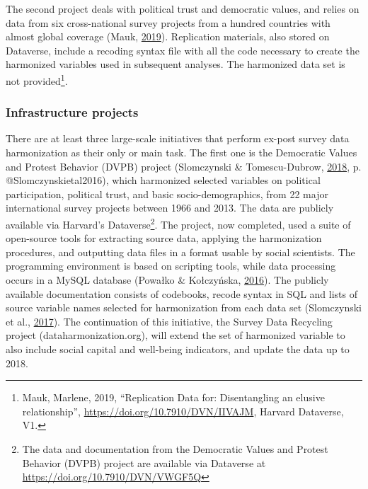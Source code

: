 \documentclass[12pt,]{article}
\let\rmarkdownfootnote\footnote%
\def\footnote{\protect\rmarkdownfootnote}
\begin{document}
The second project deals with political trust and democratic values, and relies on data from six cross-national survey projects from a hundred countries with almost global coverage (Mauk, \protect\hyperlink{ref-Mauk2019}{2019}). Replication materials, also stored on Dataverse, include a recoding syntax file with all the code necessary to create the harmonized variables used in subsequent analyses. The harmonized data set is not provided\footnote{Mauk, Marlene, 2019, ``Replication Data for: Disentangling an elusive relationship'', \url{https://doi.org/10.7910/DVN/IIVAJM}, Harvard Dataverse, V1.}.

\hypertarget{infrastructure-projects}{%
\subsubsection{Infrastructure projects}\label{infrastructure-projects}}

There are at least three large-scale initiatives that perform ex-post survey data harmonization as their only or main task. The first one is the Democratic Values and Protest Behavior (DVPB) project (Slomczynski \& Tomescu-Dubrow, \protect\hyperlink{ref-Slomczynski2018}{2018}, p. @Slomczynskietal2016), which harmonized selected variables on political participation, political trust, and basic socio-demographics, from 22 major international survey projects between 1966 and 2013. The data are publicly available via Harvard's Dataverse\footnote{The data and documentation from the Democratic Values and Protest Behavior (DVPB) project are available via Dataverse at \url{https://doi.org/10.7910/DVN/VWGF5Q}}.
The project, now completed, used a suite of open-source tools for extracting source data, applying the harmonization procedures, and outputting data files in a format usable by social scientists. The programming environment is based on scripting tools, while data processing occurs in a MySQL database (Powałko \& Kołczyńska, \protect\hyperlink{ref-Powako2016}{2016}). The publicly available documentation consists of codebooks, recode syntax in SQL and lists of source variable names selected for harmonization from each data set (Slomczynski et al., \protect\hyperlink{ref-Slomczynskietal2017}{2017}). The continuation of this initiative, the Survey Data Recycling project (dataharmonization.org), will extend the set of harmonized variable to also include social capital and well-being indicators, and update the data up to 2018.
\end{document}

